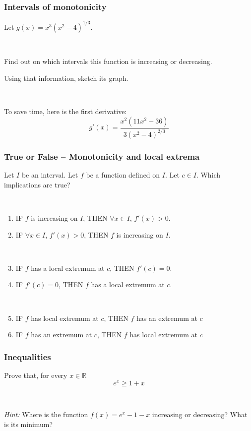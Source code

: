 \documentclass[14pt]{beamer}
\newcommand {\DS} [1] {${\displaystyle #1}$}
\newcommand {\R}{\mathbb{R}}
\newcommand{\azul}[1]{{\color{blue} #1}}
\newcommand{\rojo}[1]{{\color{red} #1}}
\newcommand{\verde}[1]{{\color{verde} #1}}
\newcommand{\rosa}[1]{{\color{rosa} #1}}
\newcommand{\naranja}[1]{{\color{naranja} #1}}
\newcommand{\setsize}[1]{\fontsize{#1}{#1}\selectfont} %
\newcommand{\smallerfont}{\setsize{13}} %
\begin{document}

\begin{frame}
\frametitle{Intervals of monotonicity}

Let
	\DS{
		g(x) = x^3(x^2-4)^{1/3}.
	}

\
	
	Find out on which intervals this function is increasing or decreasing.
	
	Using that information, sketch its graph.
	
\

	To save time, here is the first derivative:
	$$
		g'(x) = \frac{x^2(11x^2-36)}{3(x^2-4)^{2/3}}
	$$	


\end{frame}

\begin{frame}[t]
\smallerfont
\frametitle{True or False -- Monotonicity and local extrema}

Let $I$ be an interval.  Let $f$ be a function defined on $I$.  Let $c \in I$.  
 Which implications are true?

\
\begin{enumerate}
	\item	 IF \rojo{$f$ is increasing on $I$}, \quad  THEN \azul{$\forall x \in I$, $f'(x) >0$}.
	\item	 IF \azul{$\forall x \in I$, $f'(x) >0$}, \quad THEN \rojo{$f$ is increasing on $I$}.
	
	\
	\item  IF \rosa{$f$ has a local extremum at $c$}, \quad THEN \naranja{$f'(c)=0$}.
	\item IF \naranja{$f'(c)=0$}, \quad THEN \rosa{$f$ has a local extremum at $c$}.
	
	\
	\item  IF \rosa{$f$ has local extremum at $c$}, \; THEN \verde{$f$ has an extremum at $c$}
	\item  IF \verde{$f$ has an extremum at $c$}, \; THEN \rosa{$f$ has local extremum at $c$}
\end{enumerate}

\end{frame}

\begin{frame}[t]
\frametitle{Inequalities}


Prove that, for every $x \in \R$
	$$
		e^x \geq 1 + x
	$$	
	
\

\emph{Hint:}  Where is the function \DS{f(x) =e^x - 1-x} increasing or decreasing?  What is its minimum?
	
\end{frame}
\end{document}
